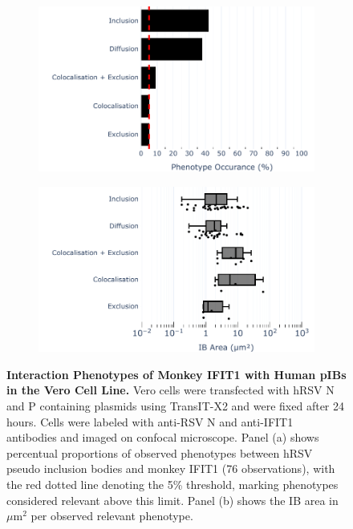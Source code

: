 \begin{figure}
    \begin{subfigure}{0.495\textwidth}
        \caption{}
        \includegraphics[width=1\linewidth]{09. Chapter 4/Figs/01. pIB/02. IFIT1/04. bar_i1_vero_hnhp.pdf} 
    \end{subfigure}
    \begin{subfigure}{0.495\textwidth}
        \caption{}
        \includegraphics[width=1\linewidth]{09. Chapter 4/Figs/01. pIB/02. IFIT1/05. box_i1_vero_hnhp.pdf}
    \end{subfigure}
    \caption[Interaction Phenotypes of Monkey IFIT1 with Human pIBs in the Vero Cell Line.]{\textbf{Interaction Phenotypes of Monkey IFIT1 with Human pIBs in the Vero Cell Line.} Vero cells were transfected with hRSV N and P containing plasmids using TransIT-X2 and were fixed after 24 hours. Cells were labeled with anti-RSV N and anti-IFIT1 antibodies and imaged on confocal microscope. Panel (a) shows percentual proportions of observed phenotypes between hRSV pseudo inclusion bodies and monkey IFIT1 (76 observations), with the red dotted line denoting the 5\% threshold, marking phenotypes considered relevant above this limit. Panel (b) shows the IB area in \(\mu \mbox{m}^2\) per observed relevant phenotype.}
    \label{fig:Interaction Phenotypes of Monkey IFIT1 with Human pIBs in the VERO Cell Line}
\end{figure}

